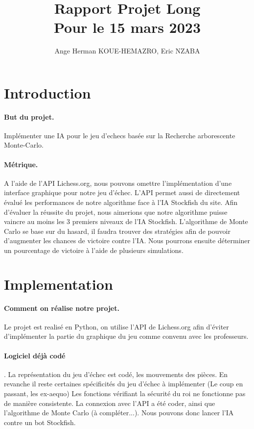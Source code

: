\documentclass{article}
\title{Rapport Projet Long\\ Pour le 15 mars 2023}
\author{Ange Herman KOUE-HEMAZRO, Eric NZABA}
\begin{document}
\maketitle


\section{Introduction}
\paragraph{But du projet.} Implémenter une IA pour le jeu d'echecs basée sur la Recherche 
arborescente Monte-Carlo.

\paragraph{Métrique.} A l'aide de l'API Lichess.org, nous pouvons omettre l'implémentation d'une interface graphique pour notre jeu d'échec. L'API permet aussi de directement évalué les performances de notre algorithme face à l'IA Stockfish du site. Afin d'évaluer la réussite du projet, nous aimerions que notre algorithme puisse vaincre au moins les 3 premiers niveaux de l'IA Stockfish.
L'algorithme de Monte Carlo se base sur du hasard, il faudra trouver des stratégies afin de pouvoir d'augmenter les chances de victoire contre l'IA.
Nous pourrons ensuite déterminer un pourcentage de victoire à l'aide de plusieurs simulations.

\section{Implementation}
\paragraph{Comment on réalise notre projet.} 
Le projet est realisé en Python, on utilise l'API de Lichess.org afin d'éviter d'implémenter la partie du graphique du jeu comme convenu avec les professeurs.

\paragraph{Logiciel déjà codé} . La représentation du jeu d'échec est codé, les mouvements des pièces. En revanche il reste certaines spécificités du jeu d'échec à implémenter (Le coup en passant, les ex-aequo) Les fonctions vérifiant la sécurité du roi ne fonctionne pas de manière consistente.
La connexion avec l'API a été coder, ainsi que l'algorithme de Monte Carlo (à compléter...). Nous pouvons donc lancer l'IA contre un bot Stockfish.
\end{document}

